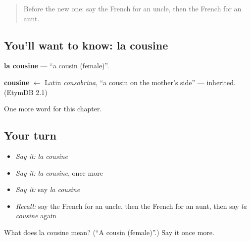\label{lesson:FR-C57-cousine}



\begin{quote}
Before the new one: say the French for an uncle, then the French for an aunt.
\end{quote}

\subsection*{You'll want to know: la cousine}
\textbf{la cousine} — \textquotedblleft{}a cousin (female)\textquotedblright{}.

\begin{cousinweb}
\textbf{cousine} $\leftarrow$ Latin \emph{consobrina}, \textquotedblleft{}a cousin on the mother's side\textquotedblright{} — inherited. (EtymDB 2.1)
\end{cousinweb}

\begin{grammarlens}[title={What you've built}]
One more word for this chapter.
\end{grammarlens}

\subsection*{Your turn}
\begin{itemize}
\raggedright
  \item \emph{Say it:} \emph{la cousine}
  \item \emph{Say it:} \emph{la cousine}, once more
  \item \emph{Say it:} say \emph{la cousine}
  \item \emph{Recall:} say the French for an uncle, then the French for an aunt, then say \emph{la cousine} again
\end{itemize}

\begin{tcolorbox}[breakable,colback=teal!4,colframe=teal!35!black,title={Before you move on}]
What does la cousine mean? (\textquotedblleft{}A cousin (female)\textquotedblright{}.) Say it once more.
\end{tcolorbox}
